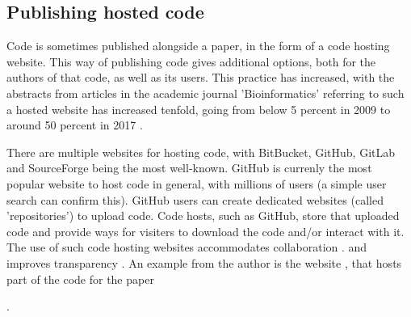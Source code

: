 \subsection{Publishing hosted code}

Code is sometimes published alongside a paper, 
in the form of a code hosting website.
This way of publishing code gives additional options,
both for the authors of that code, as well as its users.
This practice has increased,
with the abstracts from articles in the academic journal
'Bioinformatics' referring to such a hosted website
has increased tenfold, going from below 5 percent in 2009 
to around 50 percent in 2017 \cite{russell2018large}.


There are multiple websites for hosting code, with BitBucket, GitHub,
GitLab and SourceForge being the most well-known.
GitHub is currenly the most popular website to host code in general,
with millions of users (a simple user search can confirm this).
GitHub users can create dedicated websites (called 'repositories')
to upload code. Code hosts, such as GitHub, 
store that uploaded code and provide ways 
for visiters to download the code and/or interact with it.
The use of such code hosting websites
accommodates collaboration \cite{perez2016ten}.
and improves transparency \cite{gorgolewski2016practical}.
An example from the author is the website \cite{bbbqarticleissue157},
that hosts part of the code for the paper \cite{bilderbeek2022transmembrane}

.

